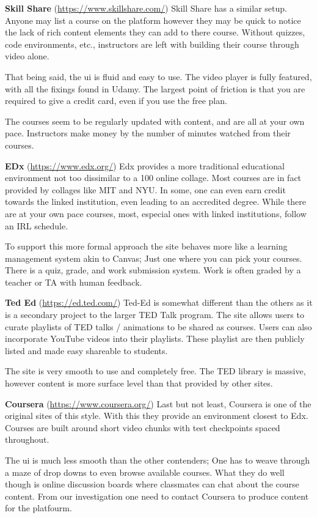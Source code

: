 \documentclass{article}
\begin{document}
\textbf{Skill Share} (\url{https://www.skillshare.com/})
Skill Share has a similar setup. Anyone may list a course on the platform
however they may be quick to notice the lack of rich content elements they can
add to there course. Without quizzes, code environments, etc., instructors are
left with building their course through video alone.

That being said, the ui is fluid and easy to use. The video player is fully
featured, with all the fixings found in Udamy. The largest point of friction is
that you are required to give a credit card, even if you use the free
plan.

The courses seem to be regularly updated with content, and are all at your own
pace. Instructors make money by the number of minutes watched from their
courses.

\textbf{EDx} (\url{https://www.edx.org/})
Edx provides a more traditional educational environment not too dissimilar to a 100%
online collage. Most courses are in fact provided by collages like MIT and NYU.
In some, one can even earn credit towards the linked institution, even leading
to an accredited degree. While there are at your own pace courses,
most, especial ones with linked institutions, follow an IRL schedule.

To support this more formal approach the site behaves more like a learning
management system akin to Canvas; Just one where you can pick your courses.
There is a quiz, grade, and work submission system. Work is often graded by a
teacher or TA with human feedback.

\textbf{Ted Ed} (\url{https://ed.ted.com/})
Ted-Ed is somewhat different than the others as it is a secondary project to
the larger TED Talk program. The site allows users to curate playlists of TED
talks / animations to be shared as courses. Users can also incorporate YouTube
videos into their playlists. These playlist are then publicly listed and made
easy shareable to students.

The site is very smooth to use and completely free. The TED library is massive,
however content is more surface level than that provided by other sites.

\textbf{Coursera} (\url{https://www.coursera.org/})
Last but not least, Coursera is one of the original sites of this style. With
this they provide an environment closest to Edx. Courses are built around short
video chunks with test checkpoints spaced throughout.

The ui is much less smooth than the other contenders; One has to weave through
a maze of drop downs to even browse available courses. What they do well though
is online discussion boards where classmates can chat about the course content.
From our investigation one need to contact Coursera to produce content for the
platfourm.
\end{document}
